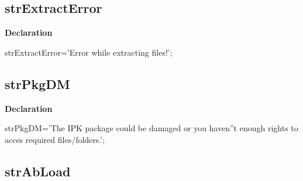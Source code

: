 \documentclass{report}
\newif\ifpdf
\begin{document}
\subsection*{strExtractError}
\fi
\label{trstrings-strExtractError}
\begin{list}{}{
\setlength{\itemindent}{0cm}
\setlength{\listparindent}{0cm}
\setlength{\leftmargin}{\evensidemargin}
\addtolength{\leftmargin}{\tmplength}
\settowidth{\labelsep}{X}
\addtolength{\leftmargin}{\labelsep}
\setlength{\labelwidth}{\tmplength}
}
\item[\textbf{Declaration}\hfill]
\ifpdf
\begin{flushleft}
\fi
\begin{ttfamily}
strExtractError='Error while extracting files!';\end{ttfamily}

\ifpdf
\end{flushleft}
\fi

\end{list}
\ifpdf
\subsection*{\large{\textbf{strPkgDM}}\normalsize\hspace{1ex}\hrulefill}
\else
\subsection*{strPkgDM}
\fi
\label{trstrings-strPkgDM}
\begin{list}{}{
\setlength{\itemindent}{0cm}
\setlength{\listparindent}{0cm}
\setlength{\leftmargin}{\evensidemargin}
\addtolength{\leftmargin}{\tmplength}
\settowidth{\labelsep}{X}
\addtolength{\leftmargin}{\labelsep}
\setlength{\labelwidth}{\tmplength}
}
\item[\textbf{Declaration}\hfill]
\ifpdf
\begin{flushleft}
\fi
\begin{ttfamily}
strPkgDM='The IPK package could be damaged or you haven''t enough rights to acces required files/folders.';\end{ttfamily}

\ifpdf
\end{flushleft}
\fi

\end{list}
\ifpdf
\subsection*{\large{\textbf{strAbLoad}}\normalsize\hspace{1ex}\hrulefill}
\else
\end{document}
